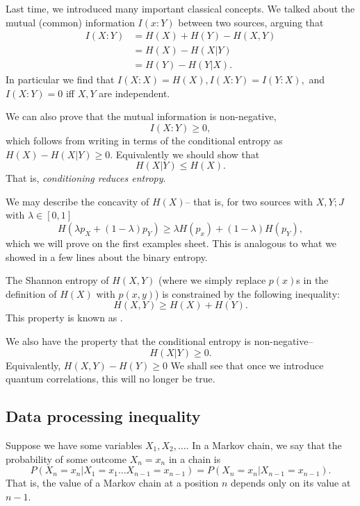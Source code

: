 Last time, we introduced many important classical concepts. We talked about the mutual (common) information $I(x:Y)$ between two sources, arguing that
\begin{align*}
    I(X:Y) &= H(X) + H(Y) - H(X,Y)\\
        &= H(X) - H(X|Y)\\
        &= H(Y)- H(Y|X).
\end{align*}
In particular we find that $I(X:X)=H(X), I(X:Y)=I(Y:X),$ and $I(X:Y)=0$ iff $X,Y$ are independent.

We can also prove that the mutual information is non-negative,
\begin{equation}
    I(X:Y) \geq 0,
\end{equation}
which follows from writing in terms of the conditional entropy as $H(X)-H(X|Y) \geq 0$. Equivalently we should show that
\begin{equation}
    H(X|Y) \leq H(X).
\end{equation}
That is, \emph{conditioning reduces entropy}.

We may describe the concavity of $H(X)$-- that is, for two sources with $X,Y; J$ with $\lambda\in [0,1]$
\begin{equation}
    H(\lambda p_X +(1-\lambda)p_Y) \geq \lambda H(p_x) + (1-\lambda) H(p_Y),
\end{equation}
which we will prove on the first examples sheet. This is analogous to what we showed in a few lines about the binary entropy.

The Shannon entropy of $H(X,Y)$ (where we simply replace $p(x)$s in the definition of $H(X)$ with $p(x,y)$) is constrained by the following inequality:
\begin{equation}
    H(X,Y) \geq H(X) + H(Y).
\end{equation}
This property is known as .

We also have the property that the conditional entropy is non-negative--
\begin{equation}
    H(X|Y) \geq 0.
\end{equation}
Equivalently, $H(X,Y) - H(Y) \geq 0$
We shall see that once we introduce quantum correlations, this will no longer be true.

\subsection*{Data processing inequality}
Suppose we have some variables $X_1,X_2,\ldots$. In a Markov chain, we say that the probability of some outcome $X_n=x_n$ in a chain is
\begin{equation}
    P(X_n=x_n | X_1=x_1 \ldots X_{n-1} = x_{n-1}) = P(X_n = x_n | X_{n-1} = x_{n-1}).
\end{equation}
That is, the value of a Markov chain at a position $n$ depends only on its value at $n-1$.

